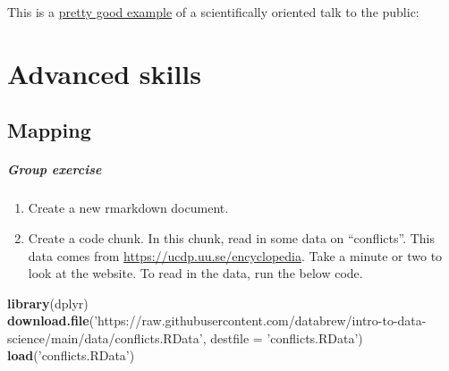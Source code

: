 \documentclass[
]{book}
\newenvironment{Shaded}{\begin{snugshade}}{\end{snugshade}}
\newcommand{\DataTypeTok}[1]{\textcolor[rgb]{0.13,0.29,0.53}{#1}}
\newcommand{\KeywordTok}[1]{\textcolor[rgb]{0.13,0.29,0.53}{\textbf{#1}}}
\newcommand{\NormalTok}[1]{#1}
\newcommand{\StringTok}[1]{\textcolor[rgb]{0.31,0.60,0.02}{#1}}
\begin{document}
This is a \href{https://www.youtube.com/watch?v=mae2eugjUsU}{pretty good example} of a scientifically oriented talk to the public:

\hypertarget{part-advanced-skills}{%
\part{Advanced skills}\label{part-advanced-skills}}

\hypertarget{mapping}{%
\chapter{Mapping}\label{mapping}}

\hypertarget{group-exercise}{%
\subsubsection*{Group exercise}\label{group-exercise}}

\begin{enumerate}
\def\labelenumi{\arabic{enumi}.}
\item
  Create a new rmarkdown document.
\item
  Create a code chunk. In this chunk, read in some data on ``conflicts''. This data comes from \url{https://ucdp.uu.se/encyclopedia}. Take a minute or two to look at the website. To read in the data, run the below code.
\end{enumerate}

\begin{Shaded}
\begin{Highlighting}[]
\KeywordTok{library}\NormalTok{(dplyr)}
\KeywordTok{download.file}\NormalTok{(}\StringTok{'https://raw.githubusercontent.com/databrew/intro-to-data-science/main/data/conflicts.RData'}\NormalTok{,}
              \DataTypeTok{destfile =} \StringTok{'conflicts.RData'}\NormalTok{)}
\KeywordTok{load}\NormalTok{(}\StringTok{'conflicts.RData'}\NormalTok{)}
\end{Highlighting}
\end{Shaded}
\end{document}
